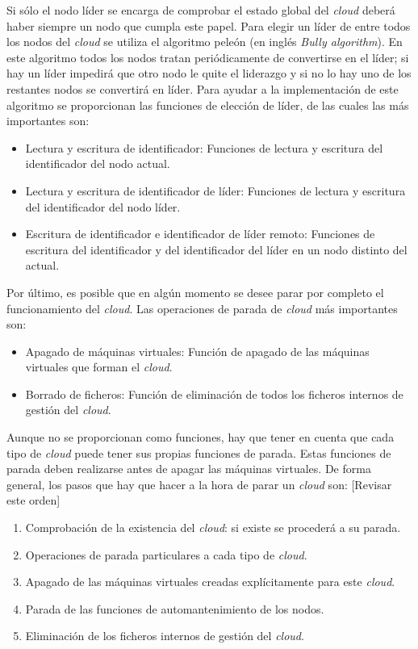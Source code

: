 Si sólo el nodo líder se encarga de comprobar el estado global del \emph{cloud} deberá haber siempre un nodo que cumpla este papel. Para elegir un líder de entre todos los nodos del \emph{cloud} se utiliza el algoritmo peleón (en inglés \emph{Bully algorithm}). En este algoritmo todos los nodos tratan periódicamente de convertirse en el líder; si hay un líder impedirá que otro nodo le quite el liderazgo y si no lo hay uno de los restantes nodos se convertirá en líder. Para ayudar a la implementación de este algoritmo se proporcionan las funciones de elección de líder, de las cuales las más importantes son:
\begin{itemize}
\item Lectura y escritura de identificador: Funciones de lectura y escritura del identificador del nodo actual.
\item Lectura y escritura de identificador de líder: Funciones de lectura y escritura del identificador del nodo líder.
\item Escritura de identificador e identificador de líder remoto: Funciones de escritura del identificador y del identificador del líder en un nodo distinto del actual.
\end{itemize}

Por último, es posible que en algún momento se desee parar por completo el funcionamiento del \emph{cloud}. Las operaciones de parada de \emph{cloud} más importantes son:
\begin{itemize}
\item Apagado de máquinas virtuales: Función de apagado de las máquinas virtuales que forman el \emph{cloud}.
\item Borrado de ficheros: Función de eliminación de todos los ficheros internos de gestión del \emph{cloud}.
\end{itemize}

Aunque no se proporcionan como funciones, hay que tener en cuenta que cada tipo de \emph{cloud} puede tener sus propias funciones de parada. Estas funciones de parada deben realizarse antes de apagar las máquinas virtuales. De forma general, los pasos que hay que hacer a la hora de parar un \emph{cloud} son:
[Revisar este orden]
\begin{enumerate}
\item Comprobación de la existencia del \emph{cloud}: si existe se procederá a su parada.
\item Operaciones de parada particulares a cada tipo de \emph{cloud}.
\item Apagado de las máquinas virtuales creadas explícitamente para este \emph{cloud}.
\item Parada de las funciones de automantenimiento de los nodos.
\item Eliminación de los ficheros internos de gestión del \emph{cloud}.
\end{enumerate}


